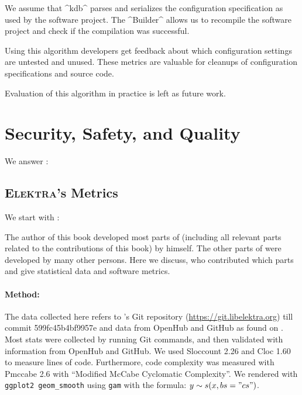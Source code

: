 \begin{code}[language=Cpp,firstnumber=19] 
\fi


We assume that ^kdb^ parses and serializes the configuration specification as used by the software project.
The ^Builder^ allows us to recompile the software project and check if the compilation was successful.

Using this algorithm developers get feedback about which configuration settings are untested and unused.
These metrics are valuable for cleanups of configuration specifications and source code.

Evaluation of this algorithm in practice is left as future work.




































\section{Security, Safety, and Quality}
\label{sec:security}

We answer :
\rqImplicationSecurity*

\subsection{\textsc{Elektra}'s Metrics}
\label{sec:elektra-metrics}

We start with :
\rqImplicationMetrics*

The author of this book developed most parts of \elektra{} (including all relevant parts related to the contributions of this book) by himself.
The other parts of \elektra{} were developed by many other persons.
Here we discuss, who contributed which parts and give statistical data and software metrics.


\paragraph{Method:}
The data collected here refers to \elektra{}'s Git repository (\url{https://git.libelektra.org}) till commit 599fc45b4bf9957e and data from OpenHub and GitHub as found on .
Most stats were collected by running Git commands, and then validated with information from OpenHub and GitHub.
We used Sloccount 2.26 and Cloc 1.60~\cite{danial2017cloc} to measure lines of code.
Furthermore, code complexity was measured with Pmccabe 2.6 with ``Modified McCabe Cyclomatic Complexity''.
We rendered  with \texttt{ggplot2 geom\_smooth} using \texttt{gam} with the formula: $y \sim s(x, bs = "cs")$.


\end{code}
